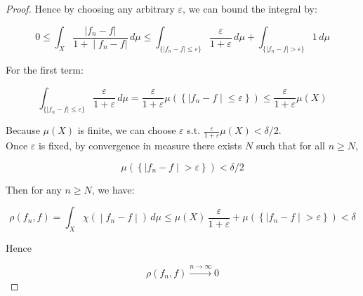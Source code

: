 \begin{proof}
Hence by choosing any arbitrary \(\varepsilon\), we can bound the integral by:

\[0 \leq \int_{X}\frac{|f_{n} - f|}{\left. 1 + \middle| f_{n} - f| \right.}\, d\mu \leq \int_{\{{|f_{n} - f| \leq \varepsilon}\}}\frac{\varepsilon}{1 + \varepsilon}\, d\mu + \int_{\{{|f_{n} - f| > \varepsilon}\}}1\, d\mu\]

For the first term:

\[\int_{\{{|f_{n} - f| \leq \varepsilon}\}}\frac{\varepsilon}{1 + \varepsilon}\, d\mu = \frac{\varepsilon}{1 + \varepsilon}\mu(\left\{ |f_{n} - f \middle| \leq \varepsilon \right\}) \leq \frac{\varepsilon}{1 + \varepsilon}\mu(X)\]

Because \(\mu(X)\) is finite, we can choose \(\varepsilon\) s.t. \(\frac{\varepsilon}{1 + \varepsilon}\mu(X) < \delta/2\).\\
Once \(\varepsilon\) is fixed, by convergence in measure there exists \(N\) such that for all \(n \geq N\),

\[\mu(\left\{ |f_{n} - f \middle| > \varepsilon \right\}) < \delta/2\]

Then for any \(n \geq N\), we have:

\[\left. \rho(f_{n},f) = \int_{X}\chi( \middle| f_{n} - f \middle| )\, d\mu \leq \mu(X)\,\frac{\varepsilon}{1 + \varepsilon} + \mu(\left\{ |f_{n} - f \middle| > \varepsilon \right\}) < \delta \right.\]

Hence

\[\rho(f_{n},f)\overset{n\rightarrow\infty}{\rightarrow}0\]

\end{proof}

